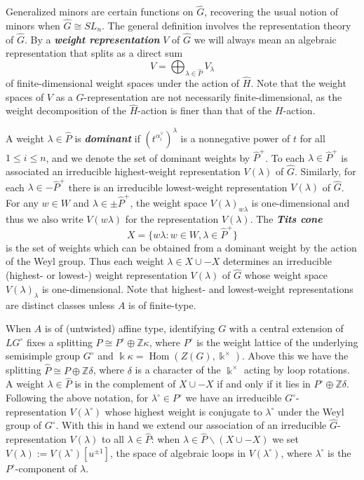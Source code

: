 \documentclass[12pt]{amsart}
\newcommand{\newword}[1]{\textbf{\emph{#1}}}
\newcommand{\ZZ}{\mathbb{Z}}
\newcommand{\kk}{\Bbbk}
\DeclareMathOperator{\Hom}{Hom}
\newcommand{\loopvar}{u}
\theoremstyle{remark}
\numberwithin{equation}{section}
\numberwithin{figure}{section}
\begin{document}
Generalized minors are certain functions on $\widehat{G}$, recovering the usual notion of minors when $\widehat{G} \cong SL_n$.
The general definition involves the representation theory of $\widehat{G}$.
By a \newword{weight representation} $V$ of $\widehat{G}$ we will always mean an algebraic representation that splits as a direct sum
\[
  V = \bigoplus_{\lambda \in \widehat{P}} V_\lambda
\]
of finite-dimensional weight spaces under the action of $\widehat{H}$.
Note that the weight spaces of $V$ as a $G$-representation are not necessarily finite-dimensional, as the weight decomposition of the $\widehat{H}$-action is finer than that of the $H$-action.

A weight $\lambda \in \widehat{P}$ is \newword{dominant} if $(t^{\alpha_i^\vee})^\lambda$ is a nonnegative power of $t$ for all $1 \leq i \leq n$, and we denote the set of dominant weights by $\widehat{P}^+$.
To each $\lambda \in \widehat{P}^+$ is associated an irreducible highest-weight representation $V(\lambda)$ of $\widehat{G}$.
Similarly, for each $\lambda \in -\widehat{P}^+$ there is an irreducible lowest-weight representation $V(\lambda)$ of $\widehat{G}$.
For any $w\in W$ and $\lambda\in\pm\widehat{P}^+$, the weight space $V(\lambda)_{w\lambda}$ is one-dimensional and thus we also write $V(w\lambda)$ for the representation $V(\lambda)$.
The \newword{Tits cone} $$X = \{w\lambda : w \in W, \lambda \in \widehat{P}^+\}$$ is the set of weights which can be obtained from a dominant weight by the action of the Weyl group.
Thus each weight $\lambda\in X \cup -X$ determines an irreducible (highest- or lowest-) weight representation $V(\lambda)$ of $\widehat{G}$ whose weight space $V(\lambda)_\lambda$ is one-dimensional.
Note that highest- and lowest-weight representations are distinct classes unless $A$ is of finite-type.

When $A$ is of (untwisted) affine type, identifying $G$ with a central extension of $LG^\circ$ fixes a splitting $P \cong P^\circ \oplus \ZZ \kappa$, where $P^\circ$ is the weight lattice of the underlying semisimple group $G^\circ$ and $\kk \kappa = \Hom( Z(G),\kk^\times)$.
Above this we have the splitting $\widehat{P} \cong P \oplus \ZZ \delta$, where $\delta$ is a character of the $\kk^\times$ acting by loop rotations.
A weight $\lambda \in \widehat{P}$ is in the complement of $X \cup -X$ if and only if it lies in $P^\circ \oplus \ZZ \delta$.
Following the above notation, for $\lambda^\circ\in P^\circ$ we have an irreducible $G^\circ$-representation $V(\lambda^\circ)$ whose highest weight is conjugate to $\lambda^\circ$ under the Weyl group of $G^\circ$.
With this in hand we extend our association of an irreducible $\widehat{G}$-representation $V(\lambda)$ to all $\lambda \in \widehat{P}$: when $\lambda \in \widehat{P} \smallsetminus(X \cup -X)$ we set $V(\lambda) := V(\lambda^\circ)[\loopvar^{\pm 1}]$, the space of algebraic loops in $V(\lambda^\circ)$, where $\lambda^\circ$ is the $P^\circ$-component of $\lambda$.
\end{document}
